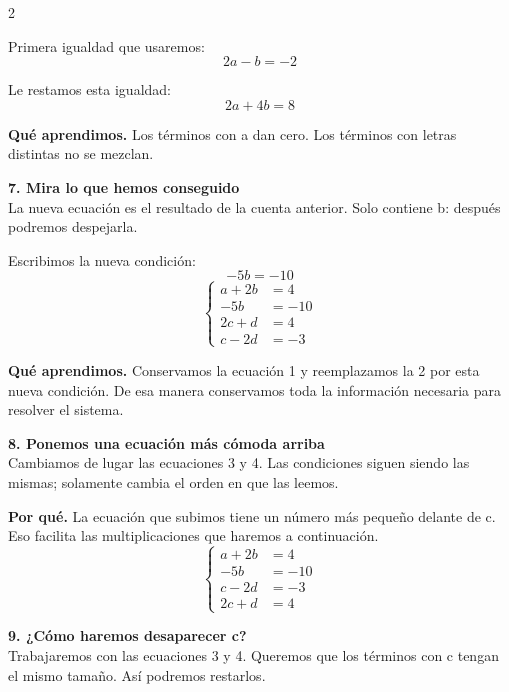 \documentclass[11pt,a4paper,landscape]{article}
\begin{document}
\begin{multicols*}{2}
\begin{minipage}{\linewidth}
\par\smallskip Primera igualdad que usaremos:
\[2a - b = -2\]
\par\smallskip Le restamos esta igualdad:
\[2a + 4b = 8\]
\par\smallskip\textbf{Qué aprendimos.} Los términos con a dan cero. Los términos con letras distintas no se mezclan.
\end{minipage}\par\medskip
\noindent\begin{minipage}{\linewidth}\textbf{7. Mira lo que hemos conseguido}\\[2pt]La nueva ecuación es el resultado de la cuenta anterior. Solo contiene b: después podremos despejarla.
\par\smallskip Escribimos la nueva condición:
\[-5b = -10\]
\[\left\{\begin{aligned}a + 2b &= 4\\-5b &= -10\\2c + d &= 4\\c - 2d &= -3\end{aligned}\right.\]
\par\smallskip\textbf{Qué aprendimos.} Conservamos la ecuación 1 y reemplazamos la 2 por esta nueva condición. De esa manera conservamos toda la información necesaria para resolver el sistema.
\end{minipage}\par\medskip
\noindent\begin{minipage}{\linewidth}\textbf{8. Ponemos una ecuación más cómoda arriba}\\[2pt]Cambiamos de lugar las ecuaciones 3 y 4. Las condiciones siguen siendo las mismas; solamente cambia el orden en que las leemos.
\par\smallskip\textbf{Por qué.} La ecuación que subimos tiene un número más pequeño delante de c. Eso facilita las multiplicaciones que haremos a continuación.
\[\left\{\begin{aligned}a + 2b &= 4\\-5b &= -10\\c - 2d &= -3\\2c + d &= 4\end{aligned}\right.\]
\end{minipage}\par\medskip
\noindent\begin{minipage}{\linewidth}\textbf{9. ¿Cómo haremos desaparecer c?}\\[2pt]Trabajaremos con las ecuaciones 3 y 4. Queremos que los términos con c tengan el mismo tamaño. Así podremos restarlos.

\end{minipage}
\end{multicols*}
\end{document}
